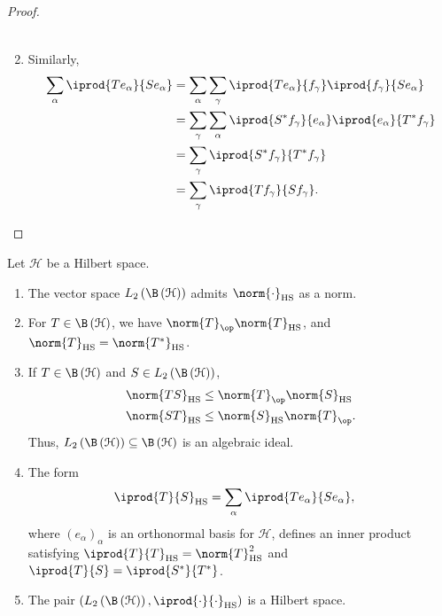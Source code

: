 \documentclass[10pt]{mypackage}
\DeclareMathOperator{\hs}{HS}
\begin{document}
\begin{proof}
\begin{enumerate}[(1)]
\begin{align*}
      \end{align*}
    \item Similarly,
      \begin{align*}
        \sum_{\alpha} \iprod{Te_{\alpha}}{Se_{\alpha}} &= \sum_{\alpha}\sum_{\gamma} \iprod{Te_{\alpha}}{f_{\gamma}} \iprod{f_{\gamma}}{Se_{\alpha}}\\
                                                       &= \sum_{\gamma}\sum_{\alpha} \iprod{S^{\ast}f_{\gamma}}{e_{\alpha}} \iprod{e_{\alpha}}{T^{\ast}f_{\gamma}}\\
                                                       &= \sum_{\gamma} \iprod{S^{\ast}f_{\gamma}}{T^{\ast}f_{\gamma}}\\
                                                       &= \sum_{\gamma} \iprod{Tf_{\gamma}}{Sf_{\gamma}}.
      \end{align*}
  \end{enumerate}
\end{proof}
\begin{theorem}
  Let $\mathcal{H}$ be a Hilbert space.
  \begin{enumerate}[(1)]
    \item The vector space $L_2\left( \B\left( \mathcal{H} \right) \right)$ admits $\norm{\cdot}_{\hs}$ as a norm.
    \item For $T\in \B\left( \mathcal{H} \right)$, we have $\norm{T}_{\op}\norm{T}_{\hs}$, and $\norm{T}_{\hs} = \norm{T^{\ast}}_{\hs}$.
    \item If $T\in \B\left( \mathcal{H} \right)$ and $S\in L_2\left( \B\left( \mathcal{H} \right) \right)$,
      \begin{align*}
        \norm{TS}_{\hs}&\leq \norm{T}_{\op}\norm{S}_{\hs}\\
        \norm{ST}_{\hs} &\leq \norm{S}_{\hs}\norm{T}_{\op}.
      \end{align*}
      Thus, $L_2\left( \B\left( \mathcal{H} \right) \right)\subseteq \B\left( \mathcal{H} \right)$ is an algebraic ideal.
    \item The form
      \begin{align*}
        \iprod{T}{S}_{\hs} &= \sum_{\alpha} \iprod{Te_{\alpha}}{Se_{\alpha}},
      \end{align*}
      where $\left( e_{\alpha} \right)_{\alpha}$ is an orthonormal basis for $\mathcal{H}$, defines an inner product satisfying $ \iprod{T}{T}_{\hs} = \norm{T}_{\hs}^2 $ and $ \iprod{T}{S} = \iprod{S^{\ast}}{T^{\ast}} $.
    \item The pair $\left( L_2\left( \B\left( \mathcal{H} \right) \right), \iprod{\cdot}{\cdot}_{\hs} \right)$ is a Hilbert space.
  \end{enumerate}
\end{theorem}
\end{document}
